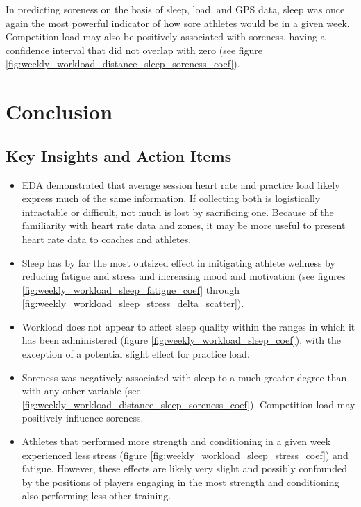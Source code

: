 \documentclass{article}
\begin{document}
			In predicting soreness on the basis of sleep, load, and GPS data, sleep
			was once again the most powerful indicator of how sore athletes would be
			in a given week. Competition load may also be positively associated
			with soreness, having a confidence interval that did not overlap with zero
			(see figure \ref{fig:weekly_workload_distance_sleep_soreness_coef}).



	\section{Conclusion}
	
		\subsection{Key Insights and Action Items}

			\begin{itemize}
				\item EDA demonstrated that average session heart rate and
				practice load likely express much of the same information.
				If collecting both is logistically intractable or difficult,
				not much is lost by sacrificing one. Because of the familiarity
				with heart rate data and zones, it may be more useful to present
				heart rate data to coaches and athletes.
				\item Sleep has by far the most outsized effect in mitigating
				athlete wellness by reducing fatigue and stress and increasing
				mood and motivation (see figures
				\ref{fig:weekly_workload_sleep_fatigue_coef} through
				\ref{fig:weekly_workload_sleep_stress_delta_scatter}).
				\item Workload does not appear to affect sleep quality within
				the ranges in which it has been administered (figure
				\ref{fig:weekly_workload_sleep_coef}), with the exception of a potential
				slight effect for practice load.
				\item Soreness was negatively associated with sleep to a much
				greater degree than with any other variable (see
				\ref{fig:weekly_workload_distance_sleep_soreness_coef}).
				Competition load may positively influence soreness.
				\item Athletes that performed more strength and conditioning
				in a given week experienced less stress (figure
				\ref{fig:weekly_workload_sleep_stress_coef}) and fatigue.
				However, these effects are likely very slight and possibly
				confounded by the positions of players engaging in the most
				strength and conditioning also performing less other training.
			\end{itemize}
\end{document}
